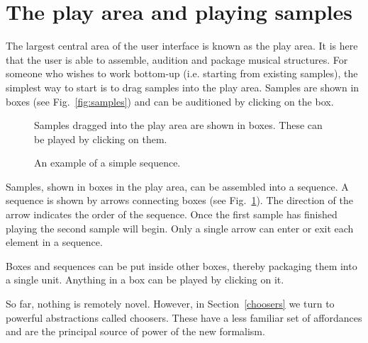 \documentclass[runningheads,a4paper]{llncs}
\begin{document}
\section{The play area and playing samples}\label{play-area}

The largest central area of the user interface is known as the play area. It is here that the user is able to assemble, audition and package musical structures. For someone who wishes to work bottom-up (i.e. starting from existing samples), the simplest way to start is to drag samples into the play area. Samples are shown in boxes (see Fig.~\ref{fig:samples}) and can be auditioned by clicking on the box.


\begin{figure}[!h]
	\begin{floatrow}
			{\caption{Samples dragged into the play area are shown in boxes. These can be played by clicking on them.}\label{fig:samples}}
			{\caption{An example of a simple sequence.}\label{fig:simple-sequence}}
	\end{floatrow}
\end{figure}


Samples, shown in boxes in the play area, can be assembled into a sequence. A sequence is shown by arrows connecting boxes (see Fig.~\ref{fig:simple-sequence}). The direction of the arrow indicates the order of the sequence. Once the first sample has finished playing the second sample will begin. Only a single arrow can enter or exit each element in a sequence.
 
Boxes and sequences can be put inside other boxes, thereby packaging them into a single unit. Anything in a box can be played by clicking on it.
 
So far, nothing is remotely novel.  However, in Section~\ref{choosers} we turn to powerful abstractions called choosers. These have a less familiar set of affordances and are the principal source of power of the new formalism.
\end{document}
